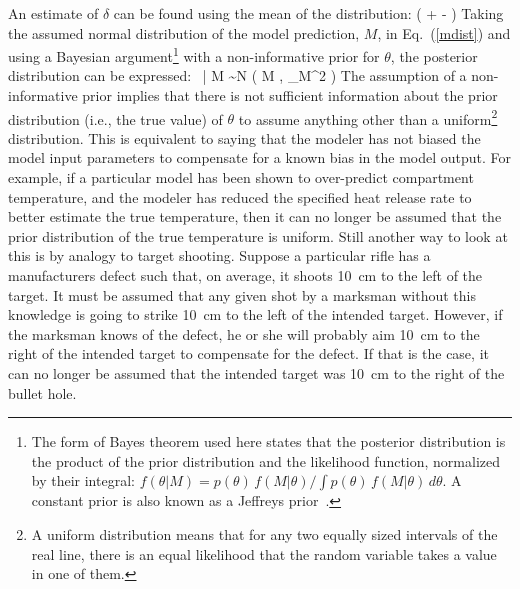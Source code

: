 An estimate of $\delta$ can be found using the mean of the distribution:
\be
   \delta \approx \exp \left(  + - \right) \label{delta}
\ee
Taking the assumed normal distribution of the model prediction, $M$, in Eq.~(\ref{mdist}) and using
a Bayesian argument\footnote{The form of Bayes theorem used here states that the posterior distribution is the product of
the prior distribution and the likelihood function, normalized by their integral:
$f(\theta|M)= p(\theta) \, f(M|\theta)/\int p(\theta) \, f(M|\theta) \, d\theta$.
A constant prior is also known as a Jeffreys prior~\cite{Gelman:Stats}.}
with a non-informative prior for $\theta$, the posterior distribution can be expressed:
\be
   \delta \, \theta \; | \; M \sim N \left( M \; , \; \sigma_M^2 \right) \label{thetaeq}
\ee
The assumption of a non-informative prior implies that there is not sufficient information about the
prior distribution (i.e., the true value) of
$\theta$ to assume anything other than a uniform\footnote{A uniform distribution means that for any two equally sized intervals of the real line,
there is an equal likelihood that the random variable takes a value in one of them.} distribution.
This is equivalent to saying that the modeler has not biased the model input parameters to compensate for a known
bias in the model output. For example, if a particular model has been shown to over-predict compartment temperature, and the modeler has reduced the specified heat release
rate to better estimate the true temperature, then it can no longer be assumed that the prior distribution of the true temperature is uniform.
Still another way to look at this is by analogy to target shooting. Suppose a particular rifle
has a manufacturers defect such that, on average, it shoots 10~cm to the left of the target. It must be assumed that any given shot by a marksman without this knowledge is
going to strike 10~cm to the left of the intended target. However, if the marksman knows of the defect, he or she will probably aim 10~cm to the right of the
intended target to compensate for the defect. If that is the case, it can no longer be assumed that the intended target was 10~cm to the right of the bullet hole.

